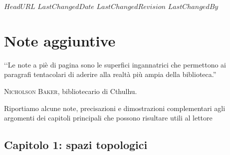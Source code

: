 \svnidlong
{$HeadURL$}
{$LastChangedDate$}
{$LastChangedRevision$}
{$LastChangedBy$}

\chapter{Note aggiuntive}
\begin{introduction}
‘‘Le note a piè di pagina sono le superfici ingannatrici che permettono ai paragrafi tentacolari di aderire alla realtà più ampia della biblioteca.''
\begin{flushright}
	\textsc{Nicholson Baker,} bibliotecario di Cthulhu.
\end{flushright}
\end{introduction}

Riportiamo alcune note, precisazioni e dimostrazioni complementari agli argomenti dei capitoli principali che possono risultare utili al lettore
\section{Capitolo 1: spazi topologici}
